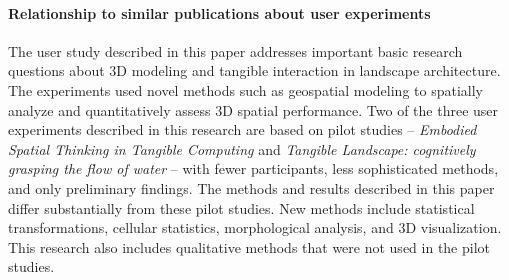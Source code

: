 \documentclass[Afour,sagev,times]{sagej}
\begin{document}
\paragraph{Relationship to similar publications about user experiments}

The user study described in this paper 
addresses important basic research questions 
about 3D modeling and tangible interaction
in landscape architecture.
%
The experiments used novel methods such as geospatial modeling 
to spatially analyze and quantitatively assess 3D spatial performance. 
%
Two of the three user experiments described in this research 
are based on pilot studies 
--
\emph{Embodied Spatial Thinking in Tangible Computing}
\cite{Harmon2016b}
and
\emph{Tangible Landscape: cognitively grasping the flow of water}
\cite{Harmon2016c}
--
with fewer participants, less sophisticated methods, and only preliminary findings.
% 
The methods and results described in this paper 
differ substantially from these pilot studies. 
New methods include statistical transformations, 
cellular statistics, morphological analysis, and 3D visualization. 
%
This research also includes qualitative methods 
that were not used in the pilot studies.




\end{document}
